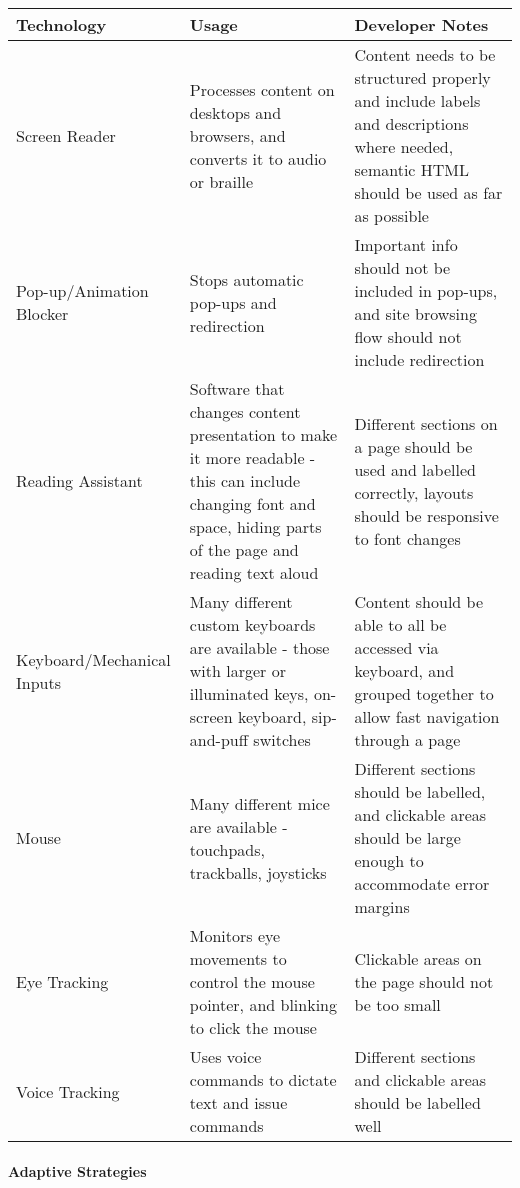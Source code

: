 \documentclass[ %
                    author={Aleena Baig},
                supervisor={Dr Simon Lock},
                    degree={BSc},
                     title={On Making Web Accessible Graphs},
                  subtitle={},
                      year={2019} ]{dissertation}
\begin{document}
\begin{center}
\begin{tabular}{|p{3cm}|p{5cm}|p{5cm}|}
 \hline
 Technology & Usage & Developer Notes \\ [0.5ex]
 \hline \hline
 Screen Reader & Processes content on desktops and browsers, and converts it to audio or braille & Content needs to be structured properly and include labels and descriptions where needed, semantic HTML should be used as far as possible \\
 \hline
 Pop-up/Animation Blocker & Stops automatic pop-ups and redirection & Important info should not be included in pop-ups, and site browsing flow should not include redirection \\
 \hline
 Reading Assistant & Software that changes content presentation to make it more readable - this can include changing font and space, hiding parts of the page and reading text aloud & Different sections on a page should be used and labelled correctly, layouts should be responsive to font changes \\
 \hline
 Keyboard/Mechanical Inputs & Many different custom keyboards are available - those with larger or illuminated keys, on-screen keyboard, sip-and-puff switches  & Content should be able to all be accessed via keyboard, and grouped together to allow fast navigation through a page \\
 \hline
 Mouse & Many different mice are available - touchpads, trackballs, joysticks & Different sections should be labelled, and clickable areas should be large enough to accommodate error margins\\
 \hline
 Eye Tracking & Monitors eye movements to control the mouse pointer, and blinking to click the mouse & Clickable areas on the page should not be too small \\
 \hline
 Voice Tracking & Uses voice commands to dictate text and issue commands & Different sections and clickable areas should be labelled well \\ [1ex]
 \hline
\end{tabular}
\end{center}


\paragraph{Adaptive Strategies}
\end{document}
